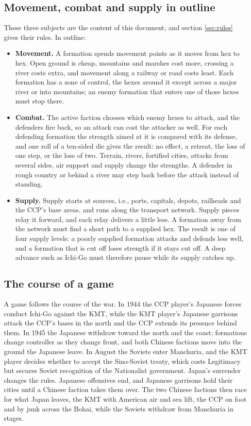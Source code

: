 \documentclass[11pt]{article}
\begin{document}
\subsection*{Movement, combat and supply in outline}
These three subjects are the content of this document, and section \ref{sec:rules} gives their rules. In outline:
\begin{itemize}
\item \textbf{Movement.} A formation spends movement points as it moves from hex to hex. Open ground is cheap, mountains and marshes cost more, crossing a river costs extra, and movement along a railway or road costs least. Each formation has a zone of control, the hexes around it except across a major river or into mountains; an enemy formation that enters one of those hexes must stop there.
\item \textbf{Combat.} The active faction chooses which enemy hexes to attack, and the defenders fire back, so an attack can cost the attacker as well. For each defending formation the strength aimed at it is compared with its defense, and one roll of a ten-sided die gives the result: no effect, a retreat, the loss of one step, or the loss of two. Terrain, rivers, fortified cities, attacks from several sides, air support and supply change the strengths. A defender in rough country or behind a river may step back before the attack instead of standing.
\item \textbf{Supply.} Supply starts at sources, i.e., ports, capitals, depots, railheads and the CCP's base areas, and runs along the transport network. Supply pieces relay it forward, and each relay delivers a little less. A formation away from the network must find a short path to a supplied hex. The result is one of four supply levels: a poorly supplied formation attacks and defends less well, and a formation that is cut off loses strength if it stays cut off. A deep advance such as Ichi-Go must therefore pause while its supply catches up.
\end{itemize}

\subsection*{The course of a game}
A game follows the course of the war. In 1944 the CCP player's Japanese forces conduct Ichi-Go against the KMT, while the KMT player's Japanese garrisons attack the CCP's bases in the north and the CCP extends its presence behind them. In 1945 the Japanese withdraw toward the north and the coast; formations change controller as they change front, and both Chinese factions move into the ground the Japanese leave. In August the Soviets enter Manchuria, and the KMT player decides whether to accept the Sino-Soviet treaty, which costs Legitimacy but secures Soviet recognition of the Nationalist government. Japan's surrender changes the rules. Japanese offensives end, and Japanese garrisons hold their cities until a Chinese faction takes them over. The two Chinese factions then race for what Japan leaves, the KMT with American air and sea lift, the CCP on foot and by junk across the Bohai, while the Soviets withdraw from Manchuria in stages.
\end{document}
